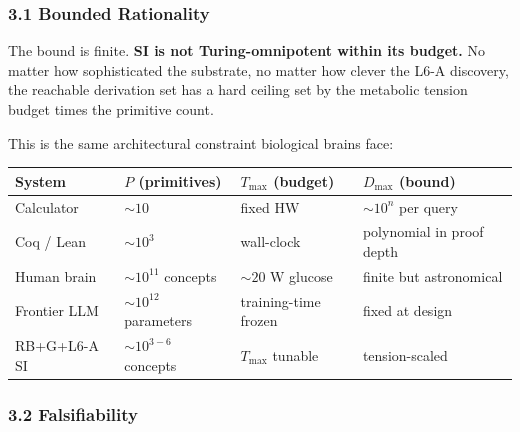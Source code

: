 \documentclass[
  11pt,
  a4paper,
]{article}
\begin{document}
\subsubsection{3.1 Bounded Rationality}\label{bounded-rationality}

The bound is finite. \textbf{SI is not Turing-omnipotent within its
budget.} No matter how sophisticated the substrate, no matter how clever
the L6-A discovery, the reachable derivation set has a hard ceiling set
by the metabolic tension budget times the primitive count.

This is the same architectural constraint biological brains face:

\begin{longtable}[]{@{}
  >{\raggedright\arraybackslash}p{}
  >{\raggedright\arraybackslash}p{}
  >{\raggedright\arraybackslash}p{}
  >{\raggedright\arraybackslash}p{}@{}}
\toprule\noalign{}
\begin{minipage}[b]{\linewidth}\raggedright
System
\end{minipage} & \begin{minipage}[b]{\linewidth}\raggedright
\(P\) (primitives)
\end{minipage} & \begin{minipage}[b]{\linewidth}\raggedright
\(T_\text{max}\) (budget)
\end{minipage} & \begin{minipage}[b]{\linewidth}\raggedright
\(D_\text{max}\) (bound)
\end{minipage} \\
\midrule\noalign{}
\endhead
\bottomrule\noalign{}
\endlastfoot
Calculator & \(\sim 10\) & fixed HW & \(\sim 10^{n}\) per query \\
Coq / Lean & \(\sim 10^3\) & wall-clock & polynomial in proof depth \\
Human brain & \(\sim 10^{11}\) concepts & \(\sim 20\) W glucose & finite
but astronomical \\
Frontier LLM & \(\sim 10^{12}\) parameters & training-time frozen &
fixed at design \\
RB+G+L6-A SI & \(\sim 10^{3-6}\) concepts & \(T_\text{max}\) tunable &
tension-scaled \\
\end{longtable}

\subsubsection{3.2 Falsifiability}\label{falsifiability}
\end{document}
